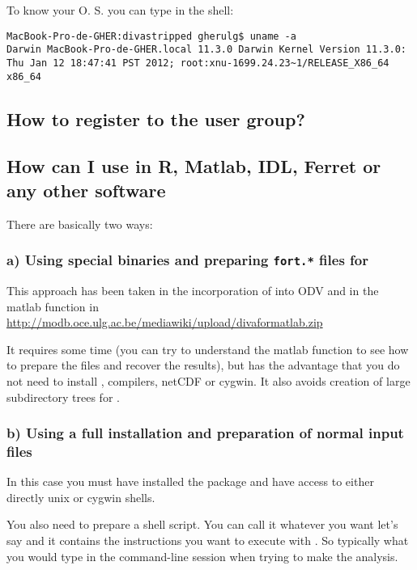 To know your O. S. you can type in the shell:

\begin{lstlisting}[style=Bash]
MacBook-Pro-de-GHER:divastripped gherulg$ uname -a
Darwin MacBook-Pro-de-GHER.local 11.3.0 Darwin Kernel Version 11.3.0: Thu Jan 12 18:47:41 PST 2012; root:xnu-1699.24.23~1/RELEASE_X86_64 x86_64
\end{lstlisting}

\subsection{How to register to the user group?}




\subsection{How can I use \diva in R, Matlab, IDL, Ferret or any other software}

There are basically two ways:

\subsubsection{a) Using special binaries and preparing {\tt fort.*} files for \diva}

This approach has been taken in the incorporation of \diva into ODV and in the matlab function in \url{http://modb.oce.ulg.ac.be/mediawiki/upload/divaformatlab.zip}

It requires some time (you can try to understand the matlab function to see how to prepare the files and recover the results), but has the advantage that you do not need to install \diva, compilers, netCDF or cygwin. It also avoids creation of large subdirectory trees for \diva. 


\subsubsection{b) Using a full \diva installation and preparation of normal \diva input files}

In this case you must have installed the \diva package and have access to either directly unix or cygwin shells. 

You also need to prepare a shell script. You can call it whatever you want let's say  and it contains the instructions you want to execute with \diva. So typically what you would type in the command-line session when trying to make the analysis.

